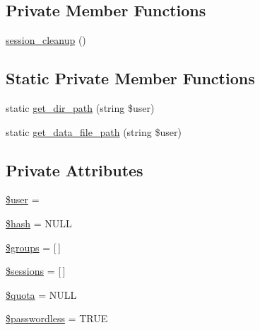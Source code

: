 \subsection*{Private Member Functions}
\begin{DoxyCompactItemize}
\item 
\hyperlink{classlibresignage_1_1common_1_1php_1_1auth_1_1User_a87f9e6639bbe95bb89cfa6996e587792}{session\+\_\+cleanup} ()
\end{DoxyCompactItemize}
\subsection*{Static Private Member Functions}
\begin{DoxyCompactItemize}
\item 
static \hyperlink{classlibresignage_1_1common_1_1php_1_1auth_1_1User_aa6c0fd2532bcf877a6392156e429f459}{get\+\_\+dir\+\_\+path} (string \$user)
\item 
static \hyperlink{classlibresignage_1_1common_1_1php_1_1auth_1_1User_a87034185abaed27656df9b9639ce106a}{get\+\_\+data\+\_\+file\+\_\+path} (string \$user)
\end{DoxyCompactItemize}
\subsection*{Private Attributes}
\begin{DoxyCompactItemize}
\item 
\hyperlink{classlibresignage_1_1common_1_1php_1_1auth_1_1User_aac73d8e991a937e5dc556e15273e94e6}{\$user} = \textquotesingle{}\textquotesingle{}
\item 
\hyperlink{classlibresignage_1_1common_1_1php_1_1auth_1_1User_ab486d67acc7f7ae2194b340f4dd1fd56}{\$hash} = N\+U\+LL
\item 
\hyperlink{classlibresignage_1_1common_1_1php_1_1auth_1_1User_a80ccede4c911355ecc04c02bd9d5abfd}{\$groups} = \mbox{[}$\,$\mbox{]}
\item 
\hyperlink{classlibresignage_1_1common_1_1php_1_1auth_1_1User_aa572dab234239ab84897d315b1275c48}{\$sessions} = \mbox{[}$\,$\mbox{]}
\item 
\hyperlink{classlibresignage_1_1common_1_1php_1_1auth_1_1User_ad23315889150c2628978cf461b543645}{\$quota} = N\+U\+LL
\item 
\hyperlink{classlibresignage_1_1common_1_1php_1_1auth_1_1User_a4f8dbed54f1bba59933f4d952e839926}{\$passwordless} = T\+R\+UE
\end{DoxyCompactItemize}



